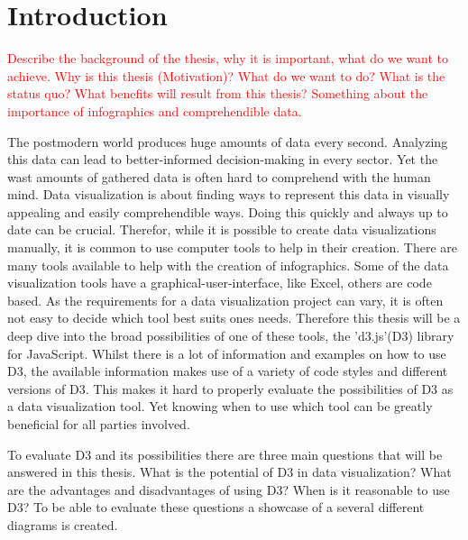\chapter{Introduction}
\textcolor{red}{
Describe the background of the thesis, why it is important, what do we want to achieve.
Why is this thesis (Motivation)? What do we want to do? What is the status quo? What benefits will result from this thesis?
Something about the importance of infographics and comprehendible data.}


The postmodern world produces huge amounts of data every second. Analyzing this data can lead to better-informed decision-making in every sector. Yet the wast amounts of gathered data is often hard to comprehend with the human mind. Data visualization is about finding ways to represent this data in visually appealing and easily comprehendible ways. Doing this quickly and always up to date can be crucial. Therefor, while it is possible to create data visualizations manually, it is common to use computer tools to help in their creation. There are many tools available to help with the creation of infographics. Some of the data visualization tools have a graphical-user-interface, like Excel, others are code based. As the requirements for a data visualization project can vary, it is often not easy to decide which tool best suits ones needs. Therefore this thesis will be a deep dive into the broad possibilities of one of these tools, the 'd3.js'(D3) library for JavaScript. Whilst there is a lot of information and examples on how to use D3, the available information makes use of a variety of code styles and different versions of D3. This makes it hard to properly evaluate the possibilities of D3 as a data visualization tool. Yet knowing when to use which tool can be greatly beneficial for all parties involved.

To evaluate D3 and its possibilities there are three main questions that will be answered in this thesis. What is the potential of D3 in data visualization? What are the advantages and disadvantages of using D3? When is it reasonable to use D3? To be able to evaluate these questions a showcase of a several different diagrams is created.
